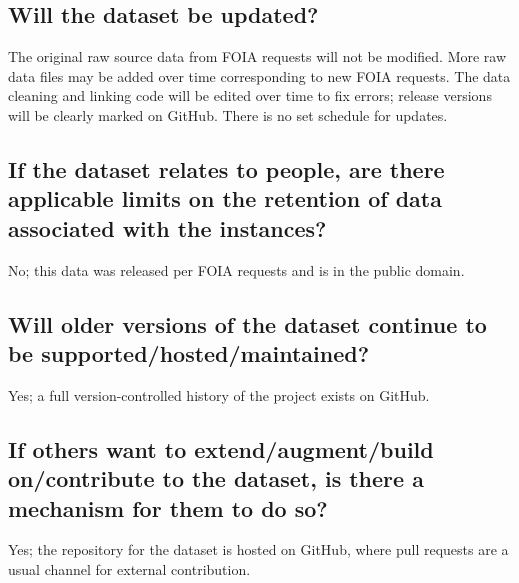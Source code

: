 \documentclass[letterpaper, 10 pt, conference]{ieeeconf}  %
\begin{document}
\subsection{Will the dataset be updated?}
The original raw source data from FOIA requests will not be modified. More raw
data files may be added over time corresponding to new FOIA requests. The data
cleaning and linking code will be edited over time to fix errors; release
versions will be clearly marked on GitHub. There is no set schedule for updates.

\subsection{If the dataset relates to people, are there applicable limits on the retention of data associated with the instances?}
No; this data was released per FOIA requests and is in the public domain.

\subsection{Will older versions of the dataset continue to be supported/hosted/maintained?}
Yes; a full version-controlled history of the project exists on GitHub.

\subsection{If others want to extend/augment/build on/contribute to the dataset, is there a mechanism for them to do so?}
Yes; the repository for the dataset is hosted on GitHub, where pull requests are a usual channel for external contribution.

  

\end{document}
